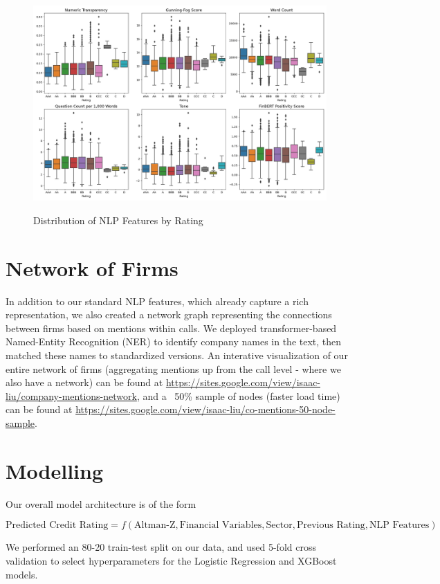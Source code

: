 \documentclass{article}[11pt]
\begin{document}
    \begin{figure}[h!]
		\centering
        \caption{Distribution of NLP Features by Rating}
        \includegraphics[width=0.6\linewidth,keepaspectratio=true]{../Output/NLP/hist_by_rating.png}
        \label{fig:dist-nlp-by-rating}
	\end{figure}

    \section*{Network of Firms}

    In addition to our standard NLP features, which already capture a rich representation, we also created a network graph representing the connections between firms based on mentions within calls. We deployed transformer-based Named-Entity Recognition (NER) \citep{spacy_spacy_2024} to identify company names in the text, then matched these names to standardized versions. An interative visualization of our entire network of firms (aggregating mentions up from the call level - where we also have a network) can be found at \url{https://sites.google.com/view/isaac-liu/company-mentions-network}, and a ~50\% sample of nodes (faster load time) can be found at \url{https://sites.google.com/view/isaac-liu/co-mentions-50-node-sample}.

    \section*{Modelling}

    Our overall model architecture is of the form

    \begin{equation*}
        \text{Predicted Credit Rating} = f(\text{Altman-Z}, \text{Financial Variables}, \text{Sector}, \text{Previous Rating}, \text{NLP Features})
    \end{equation*}

    We performed an 80-20 train-test split on our data, and used 5-fold cross validation to select hyperparameters for the Logistic Regression and XGBoost models.
\end{document}
